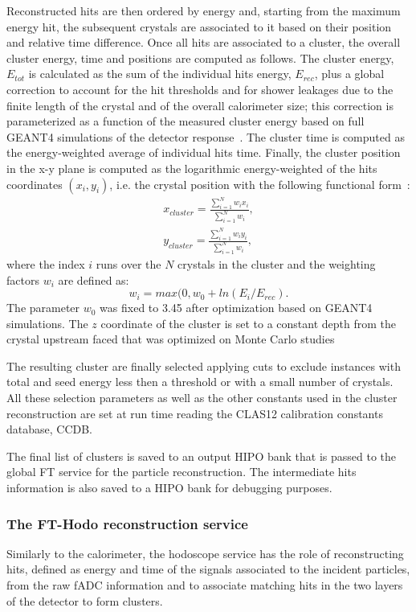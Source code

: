 Reconstructed hits are then ordered by energy and, starting from the maximum energy hit, the subsequent crystals are associated to it based on their position and relative time difference. Once all hits are associated to a cluster, the overall cluster energy, time and positions are computed as follows. The cluster energy, $E_{tot}$ is calculated as the sum of the individual hits energy, $E_{rec}$, plus a global correction to account for the hit thresholds and for shower leakages due to the finite length of the crystal and of the overall calorimeter size; this correction is parameterized as a function of the measured cluster energy based on full GEANT4 simulations of the detector response~\cite{ft-nim}. The cluster time is computed as the energy-weighted average of individual hits time. Finally, the cluster position in the x-y plane is computed as the logarithmic energy-weighted of the hits coordinates $(x_i,y_i)$, i.e. the crystal position with the following functional form~\cite{ic}:
\begin{eqnarray*}
x_{cluster} = \frac{\sum_{i=1}^N w_i x_i}{\sum_{i=1}^N w_i},\\
y_{cluster} = \frac{\sum_{i=1}^N w_i y_i}{\sum_{i=1}^N w_i},
\end{eqnarray*}
where the index $i$ runs over the $N$ crystals in the cluster and the weighting factors $w_i$ are defined as:
\begin{equation}
w_i=max(0,w_0+ln(E_i/E_{rec}).
\end{equation}
The parameter $w_0$ was fixed to 3.45 after optimization based on GEANT4 simulations. The $z$ coordinate of the cluster is set to a constant depth from the crystal upstream faced that was optimized on Monte Carlo studies

The resulting cluster are finally selected applying cuts to exclude instances with total and seed energy less then a threshold or with a small number of crystals. All these selection parameters as well as the other constants used in the cluster reconstruction are set at run time reading the CLAS12 calibration constants database, CCDB.

The final list of clusters is saved to an output HIPO bank that is passed to the global FT service for the particle reconstruction. The intermediate hits information is also saved to a HIPO bank for debugging purposes.

\subsubsection{The FT-Hodo reconstruction service}
Similarly to the calorimeter, the hodoscope service has the role of reconstructing hits, defined as energy and time of the signals associated to the incident particles, from the raw fADC information and to associate matching hits in the two layers of the detector to form clusters.

